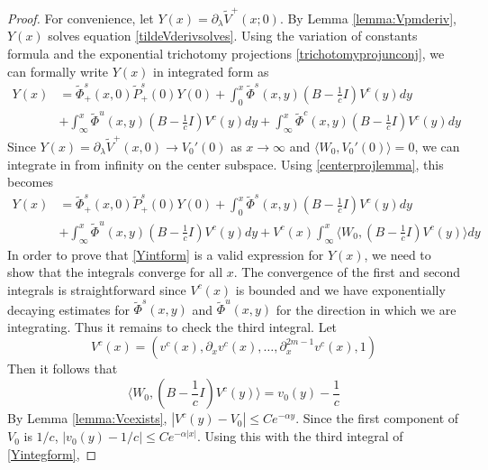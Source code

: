 \documentclass[thesis.tex]{subfiles}
\begin{document}
\begin{lemma}
\begin{enumerate}[(i)]
\end{enumerate}
\begin{proof}
For convenience, let $Y(x) = \partial_\lambda \tilde{V}^+(x; 0)$. By Lemma \ref{lemma:Vpmderiv}, $Y(x)$ solves equation \cref{tildeVderivsolves}. Using the variation of constants formula and the exponential trichotomy projections \cref{trichotomyprojunconj}, we can formally write $Y(x)$ in integrated form as
\begin{equation}\label{Yintform}
\begin{aligned}
Y(x) &= \tilde{\Phi}^s_+(x,0)\tilde{P}^s_+(0) Y(0) 
+ \int_0^x \tilde{\Phi}^s(x,y)\left( B - \frac{1}{c}I \right) V^c(y) dy \\
&+ \int_{\infty}^x \tilde{\Phi}^u(x,y)\left( B - \frac{1}{c}I \right) V^c(y) dy + \int_{\infty}^x \tilde{\Phi}^c(x,y)\left( B - \frac{1}{c}I \right) V^c(y) dy 
\end{aligned}
\end{equation}
Since $Y(x) = \partial_\lambda \tilde{V}^+(x, 0) \rightarrow V_0'(0)$ as $x \rightarrow \infty$ and $\langle W_0, V_0'(0) \rangle = 0$, we can integrate in from infinity on the center subspace. Using \cref{centerprojlemma}, this becomes
\begin{equation}\label{Yintegform}
\begin{aligned}
Y(x) &= \tilde{\Phi}^s_+(x,0)\tilde{P}^s_+(0) Y(0) 
+ \int_0^x \tilde{\Phi}^s(x,y)\left( B - \frac{1}{c}I \right) V^c(y) dy \\
&+ \int_{\infty}^x \tilde{\Phi}^u(x,y)\left( B - \frac{1}{c}I \right) V^c(y) dy + V^c(x) \int_{\infty}^x \langle W_0, \left( B - \frac{1}{c}I \right) V^c(y) \rangle dy 
\end{aligned}
\end{equation}
In order to prove that \cref{Yintform} is a valid expression for $Y(x)$, we need to show that the integrals converge for all $x$. The convergence of the first and second integrals is straightforward since $V^c(x)$ is bounded and we have exponentially decaying estimates for $\tilde{\Phi}^s(x,y)$ and $\tilde{\Phi}^u(x,y)$ for the direction in which we are integrating. Thus it remains to check the third integral. Let 
\[
V^c(x) = (v^c(x), \partial_x v^c(x), \dots, \partial_x^{2m-1} v^c(x), 1)
\]
Then it follows that
\[
\langle W_0, \left( B - \frac{1}{c}I \right) V^c(y) \rangle = v_0(y) - \frac{1}{c}
\]
By Lemma \ref{lemma:Vcexists}, $|V^c(y) - V_0|\leq Ce^{-\alpha y}$. Since the first component of $V_0$ is $1/c$, $|v_0(y) - 1/c| \leq Ce^{-\alpha |x|}$. Using this with the third integral of \cref{Yintegform}, 

\end{proof}
\end{lemma}
\end{document}
